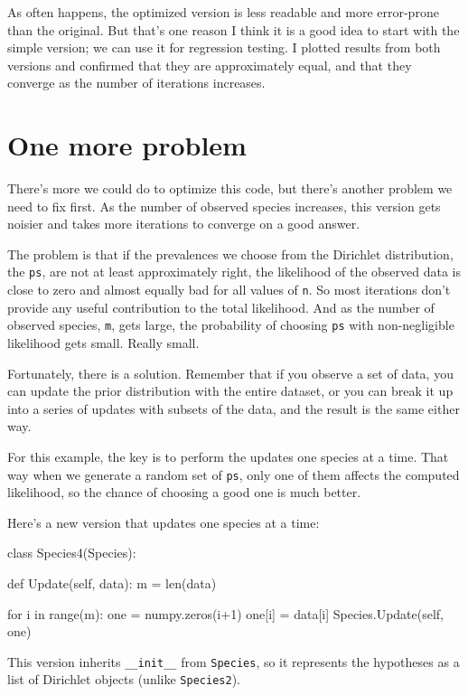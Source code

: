 \documentclass[12pt]{book}
\theoremstyle{exercise}
\newcommand{\py}[1]{{\tt #1}}%
\begin{document}
As often happens, the optimized version is less readable and more
error-prone than the original.  But that's one reason I think it is
a good idea to start with the simple version; we can use it for
regression testing.  I plotted results from both versions and confirmed
that they are approximately equal, and that they converge as the
number of iterations increases.


\section{One more problem}

There's more we could do to optimize this code, but there's another
problem we need to fix first.  As the number of observed
species increases, this version gets noisier and takes more
iterations to converge on a good answer.

The problem is that if the prevalences we choose from the Dirichlet
distribution, the \py{ps}, are not at least approximately right,
the likelihood of the observed data is close to zero and almost
equally bad for all values of \py{n}.  So most iterations don't
provide any useful contribution to the total likelihood.  And as the
number of observed species, \py{m}, gets large, the probability of
choosing \py{ps} with non-negligible likelihood gets small.  Really
small.

Fortunately, there is a solution.  Remember that if you observe
a set of data, you can update the prior distribution with the
entire dataset, or you can break it up into a series of updates
with subsets of the data, and the result is the same either way.

For this example, the key is to perform the updates one species at
a time.  That way when we generate a random set of \py{ps}, only
one of them affects the computed likelihood, so the chance of choosing
a good one is much better.

Here's a new version that updates one species at a time:

\begin{code}
class Species4(Species):

    def Update(self, data):
        m = len(data)

        for i in range(m):
            one = numpy.zeros(i+1)
            one[i] = data[i]
            Species.Update(self, one)
\end{code}

This version inherits \verb"__init__" from \py{Species}, so it
represents the hypotheses as a list of Dirichlet objects (unlike
\py{Species2}).
\end{document}
